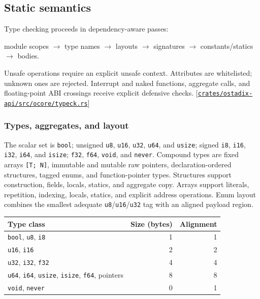 \documentclass[11pt,oneside]{article}
\newcommand{\src}[1]{\textcolor{OSlate}{\scriptsize[\href{https://github.com/lostadi/OSTADIX/blob/c0b02c326b2329a95ba52447c7180bc93957cd57/#1}{\nolinkurl{#1}}]}\allowbreak}
\begin{document}
\subsection{Static semantics}

Type checking proceeds in dependency-aware passes:

\begin{center}
module scopes $\rightarrow$ type names $\rightarrow$ layouts
$\rightarrow$ signatures $\rightarrow$ constants/statics
$\rightarrow$ bodies.
\end{center}

Unsafe operations require an explicit unsafe context. Attributes are
whitelisted; unknown ones are rejected. Interrupt and naked functions,
aggregate calls, and floating-point ABI crossings receive explicit defensive
checks. \src{crates/ostadix-api/src/ocore/typeck.rs}

\subsubsection{Types, aggregates, and layout}

The scalar set is \texttt{bool}; unsigned \texttt{u8}, \texttt{u16},
\texttt{u32}, \texttt{u64}, and \texttt{usize}; signed \texttt{i8},
\texttt{i16}, \texttt{i32}, \texttt{i64}, and \texttt{isize};
\texttt{f32}, \texttt{f64}, \texttt{void}, and \texttt{never}. Compound types
are fixed arrays \texttt{[T; N]}, immutable and mutable raw pointers,
declaration-ordered structures, tagged enums, and function-pointer types.
Structures support construction, fields, locals, statics, and aggregate copy.
Arrays support literals, repetition, indexing, locals, statics, and explicit
address operations. Enum layout combines the smallest adequate
\texttt{u8}/\texttt{u16}/\texttt{u32} tag with an aligned payload region.

\begin{center}
\begin{tabular}{lrr}
\toprule
\textbf{Type class} & \textbf{Size (bytes)} & \textbf{Alignment} \\
\midrule
\texttt{bool}, \texttt{u8}, \texttt{i8} & 1 & 1 \\
\texttt{u16}, \texttt{i16} & 2 & 2 \\
\texttt{u32}, \texttt{i32}, \texttt{f32} & 4 & 4 \\
\texttt{u64}, \texttt{i64}, \texttt{usize}, \texttt{isize},
\texttt{f64}, pointers & 8 & 8 \\
\texttt{void}, \texttt{never} & 0 & 1 \\
\bottomrule
\end{tabular}
\end{center}
\end{document}
